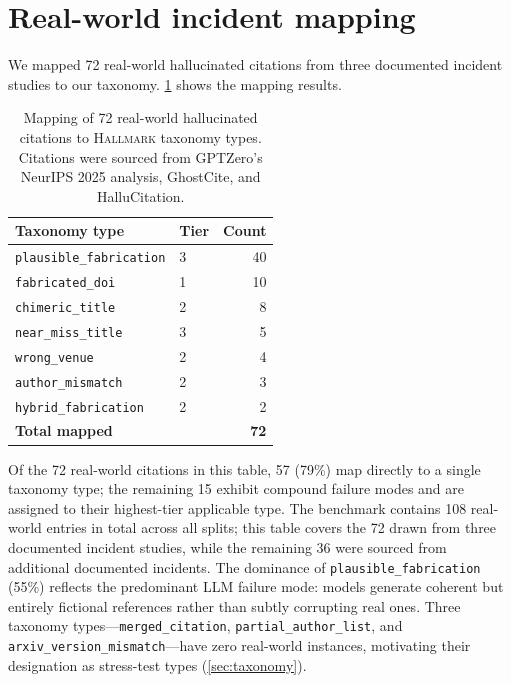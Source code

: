 \section{Real-world incident mapping}
\label{app:real-world-mapping}

We mapped 72 real-world hallucinated citations from three documented incident studies to our taxonomy.
\cref{tab:realworld} shows the mapping results.

\begin{table}[t]
\caption{Mapping of 72 real-world hallucinated citations to \textsc{Hallmark} taxonomy types. Citations were sourced from GPTZero's NeurIPS 2025 analysis, GhostCite, and HalluCitation.}
\label{tab:realworld}
\centering
\small
\begin{tabular}{llr}
\toprule
\textbf{Taxonomy type} & \textbf{Tier} & \textbf{Count} \\
\midrule
\texttt{plausible\_fabrication} & 3 & 40 \\
\texttt{fabricated\_doi} & 1 & 10 \\
\texttt{chimeric\_title} & 2 & 8 \\
\texttt{near\_miss\_title} & 3 & 5 \\
\texttt{wrong\_venue} & 2 & 4 \\
\texttt{author\_mismatch} & 2 & 3 \\
\texttt{hybrid\_fabrication} & 2 & 2 \\
\midrule
\textbf{Total mapped} & & \textbf{72} \\
\bottomrule
\end{tabular}
\end{table}

\noindent Of the 72 real-world citations in this table, 57 (79\%) map directly to a single taxonomy type; the remaining 15 exhibit compound failure modes and are assigned to their highest-tier applicable type.
The benchmark contains 108 real-world entries in total across all splits; this table covers the 72 drawn from three documented incident studies, while the remaining 36 were sourced from additional documented incidents.
The dominance of \texttt{plausible\_fabrication} (55\%) reflects the predominant LLM failure mode: models generate coherent but entirely fictional references rather than subtly corrupting real ones.
Three taxonomy types---\texttt{merged\_citation}, \texttt{partial\_author\_list}, and \texttt{arxiv\_version\_mismatch}---have zero real-world instances, motivating their designation as stress-test types (\cref{sec:taxonomy}).

